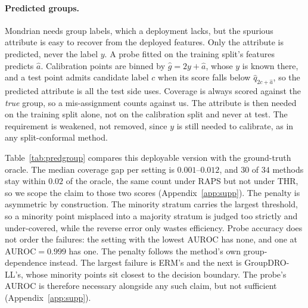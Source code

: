 \documentclass[pdflatex,sn-basic]{sn-jnl}%
\theoremstyle{thmstyleone}%
\newcommand{\auroc}{\mathrm{AUROC}}
\begin{document}
\paragraph{Predicted groups.}
\label{sec:predgroup}

Mondrian needs group labels, which a deployment lacks, but the spurious attribute is easy to
recover from the deployed features. Only the attribute is predicted, never the label $y$. A probe fitted on the training
split's features predicts $\hat a$. Calibration points are binned by $\hat g=2y+\hat a$, whose $y$
is known there, and a test point admits candidate label $c$ when its score falls below
$\hat q_{2c+\hat a}$, so the predicted attribute is all the test side uses. Coverage is always scored against the
\emph{true} group, so a mis-assignment counts against us. The attribute is then needed on the
training split alone, not on the calibration split and never at test. The requirement is weakened,
not removed, since $y$ is still needed to calibrate, as in any split-conformal method.

Table~\ref{tab:predgroup} compares this deployable version with the ground-truth oracle. The
median coverage gap per setting is $0.001$--$0.012$, and $30$ of $34$ methods stay within $0.02$ of
the oracle, the same count under RAPS but not under THR, so we scope the claim to those two scores
(Appendix~\ref{app:supp}). The penalty is asymmetric by construction. The minority stratum carries the largest
threshold, so a minority point misplaced into a majority stratum is judged too strictly and
under-covered, while the reverse error only wastes efficiency. Probe accuracy does not order the
failures: the setting with the lowest $\auroc$ has none, and one at $\auroc=0.999$ has one. The
penalty follows the method's own group-dependence instead. The largest failure is ERM's and the
next is GroupDRO-LL's, whose minority points sit closest to the decision boundary. The probe's
$\auroc$ is therefore necessary alongside any such claim, but not sufficient
(Appendix~\ref{app:supp}).
\end{document}
